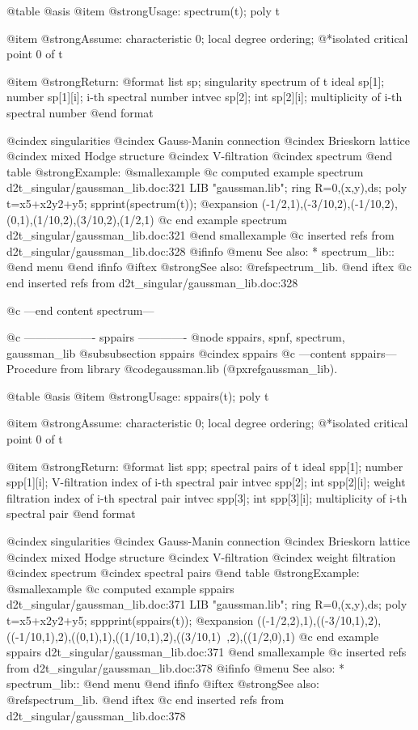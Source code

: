 @table @asis
@item @strong{Usage:}
spectrum(t); poly t

@item @strong{Assume:}
characteristic 0; local degree ordering;
@*isolated critical point 0 of t

@item @strong{Return:}
@format
list sp;  singularity spectrum of t
  ideal sp[1];
    number sp[1][i];  i-th spectral number
  intvec sp[2];
    int sp[2][i];  multiplicity of i-th spectral number
@end format

@cindex singularities
@cindex Gauss-Manin connection
@cindex Brieskorn lattice
@cindex mixed Hodge structure
@cindex V-filtration
@cindex spectrum
@end table
@strong{Example:}
@smallexample
@c computed example spectrum d2t_singular/gaussman_lib.doc:321 
LIB "gaussman.lib";
ring R=0,(x,y),ds;
poly t=x5+x2y2+y5;
spprint(spectrum(t));
@expansion{} (-1/2,1),(-3/10,2),(-1/10,2),(0,1),(1/10,2),(3/10,2),(1/2,1)
@c end example spectrum d2t_singular/gaussman_lib.doc:321
@end smallexample
@c inserted refs from d2t_singular/gaussman_lib.doc:328
@ifinfo
@menu
See also:
* spectrum_lib::
@end menu
@end ifinfo
@iftex
@strong{See also:}
@ref{spectrum_lib}.
@end iftex
@c end inserted refs from d2t_singular/gaussman_lib.doc:328

@c ---end content spectrum---

@c ------------------- sppairs -------------
@node sppairs, spnf, spectrum, gaussman_lib
@subsubsection sppairs
@cindex sppairs
@c ---content sppairs---
Procedure from library @code{gaussman.lib} (@pxref{gaussman_lib}).

@table @asis
@item @strong{Usage:}
sppairs(t); poly t

@item @strong{Assume:}
characteristic 0; local degree ordering;
@*isolated critical point 0 of t

@item @strong{Return:}
@format
list spp;  spectral pairs of t
  ideal spp[1];
    number spp[1][i];  V-filtration index of i-th spectral pair
  intvec spp[2];
    int spp[2][i];  weight filtration index of i-th spectral pair
  intvec spp[3];
    int spp[3][i];  multiplicity of i-th spectral pair
@end format

@cindex singularities
@cindex Gauss-Manin connection
@cindex Brieskorn lattice
@cindex mixed Hodge structure
@cindex V-filtration
@cindex weight filtration
@cindex spectrum
@cindex spectral pairs
@end table
@strong{Example:}
@smallexample
@c computed example sppairs d2t_singular/gaussman_lib.doc:371 
LIB "gaussman.lib";
ring R=0,(x,y),ds;
poly t=x5+x2y2+y5;
sppprint(sppairs(t));
@expansion{} ((-1/2,2),1),((-3/10,1),2),((-1/10,1),2),((0,1),1),((1/10,1),2),((3/10,1)\
   ,2),((1/2,0),1)
@c end example sppairs d2t_singular/gaussman_lib.doc:371
@end smallexample
@c inserted refs from d2t_singular/gaussman_lib.doc:378
@ifinfo
@menu
See also:
* spectrum_lib::
@end menu
@end ifinfo
@iftex
@strong{See also:}
@ref{spectrum_lib}.
@end iftex
@c end inserted refs from d2t_singular/gaussman_lib.doc:378

